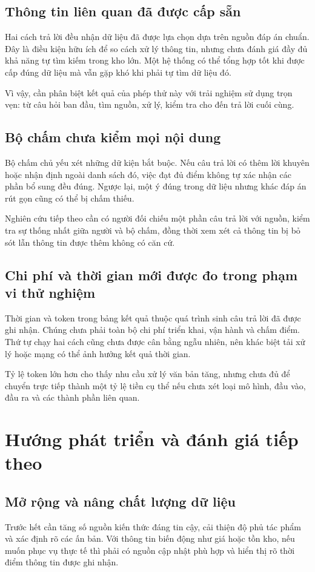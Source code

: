 \subsection{Thông tin liên quan đã được cấp sẵn}
Hai cách trả lời đều nhận dữ liệu đã được lựa chọn dựa trên nguồn đáp án chuẩn. Đây là điều kiện hữu ích để so cách xử lý thông tin, nhưng chưa đánh giá đầy đủ khả năng tự tìm kiếm trong kho lớn. Một hệ thống có thể tổng hợp tốt khi được cấp đúng dữ liệu mà vẫn gặp khó khi phải tự tìm dữ liệu đó.

Vì vậy, cần phân biệt kết quả của phép thử này với trải nghiệm sử dụng trọn vẹn: từ câu hỏi ban đầu, tìm nguồn, xử lý, kiểm tra cho đến trả lời cuối cùng.

\subsection{Bộ chấm chưa kiểm mọi nội dung}
Bộ chấm chủ yếu xét những dữ kiện bắt buộc. Nếu câu trả lời có thêm lời khuyên hoặc nhận định ngoài danh sách đó, việc đạt đủ điểm không tự xác nhận các phần bổ sung đều đúng. Ngược lại, một ý đúng trong dữ liệu nhưng khác đáp án rút gọn cũng có thể bị chấm thiếu. 

Nghiên cứu tiếp theo cần có người đối chiếu một phần câu trả lời với nguồn, kiểm tra sự thống nhất giữa người và bộ chấm, đồng thời xem xét cả thông tin bị bỏ sót lẫn thông tin được thêm không có căn cứ.

\subsection{Chi phí và thời gian mới được đo trong phạm vi thử nghiệm}
Thời gian và token trong bảng kết quả thuộc quá trình sinh câu trả lời đã được ghi nhận. Chúng chưa phải toàn bộ chi phí triển khai, vận hành và chấm điểm. Thứ tự chạy hai cách cũng chưa được cân bằng ngẫu nhiên, nên khác biệt tải xử lý hoặc mạng có thể ảnh hưởng kết quả thời gian.

Tỷ lệ token lớn hơn cho thấy nhu cầu xử lý văn bản tăng, nhưng chưa đủ để chuyển trực tiếp thành một tỷ lệ tiền cụ thể nếu chưa xét loại mô hình, đầu vào, đầu ra và các thành phần liên quan.

\section{Hướng phát triển và đánh giá tiếp theo}

\subsection{Mở rộng và nâng chất lượng dữ liệu}
Trước hết cần tăng số nguồn kiến thức đáng tin cậy, cải thiện độ phủ tác phẩm và xác định rõ các ấn bản. Với thông tin biến động như giá hoặc tồn kho, nếu muốn phục vụ thực tế thì phải có nguồn cập nhật phù hợp và hiển thị rõ thời điểm thông tin được ghi nhận.

